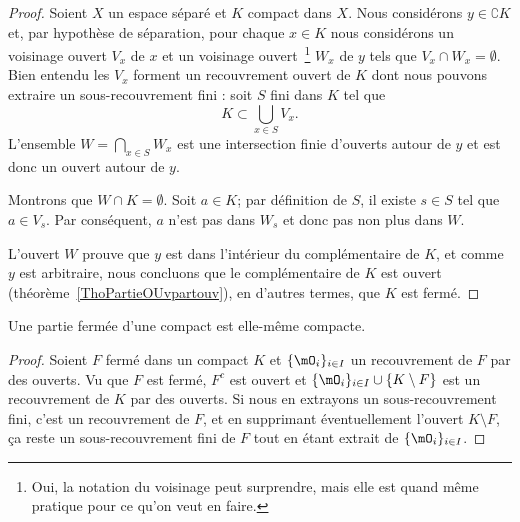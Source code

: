 \begin{proof}
    Soient \( X\) un espace séparé et \( K\) compact dans \( X\). Nous considérons \( y \in\complement K\) et, par hypothèse de séparation, pour chaque \( x\in K\) nous considérons un voisinage ouvert \( V_x\) de \( x\) et un voisinage ouvert~\footnote{Oui, la notation du voisinage peut surprendre, mais elle est quand même pratique pour ce qu'on veut en faire.} \( W_x\) de \( y\) tels que \( V_x\cap W_x=\emptyset\). Bien entendu les \( V_x\) forment un recouvrement ouvert de \( K\) dont nous pouvons extraire un sous-recouvrement fini : soit \( S\) fini dans \( K\) tel que
    \begin{equation}
        K\subset\bigcup_{x\in S}V_x.
    \end{equation}
    L'ensemble \( W=\bigcap_{x\in S}W_x\) est une intersection finie d'ouverts autour de \( y\) et est donc un ouvert autour de \( y\). 
    
    Montrons que \( W\cap K=\emptyset\). Soit \( a\in K\); par définition de \( S\), il existe \( s\in S\) tel que \( a\in V_s\). Par conséquent, \( a\) n'est pas dans \( W_s\) et donc pas non plus dans \( W\).
    

    L'ouvert \( W\) prouve que \( y\) est dans l'intérieur du complémentaire de \( K\), et comme \( y \) est arbitraire, nous concluons que le complémentaire de \( K\) est ouvert (théorème~\ref{ThoPartieOUvpartouv}), en d'autres termes, que \( K\) est fermé.
\end{proof}

\begin{lemma}   \label{LemnAeACf}
    Une partie fermée d'une compact est elle-même compacte.
\end{lemma}

\begin{proof}

    Soient \( F\) fermé dans un compact \( K\) et \( \{ \mO_i \}_{i\in I}\) un recouvrement de \( F\) par des ouverts. Vu que \( F\) est fermé, \( F^c\) est ouvert et \( \{ \mO_i \}_{i\in I}\cup\{ K\setminus F \}\) est un recouvrement de \( K\) par des ouverts. Si nous en extrayons un sous-recouvrement fini, c'est un recouvrement de \( F\), et en supprimant éventuellement l'ouvert \( K\setminus F\), ça reste un sous-recouvrement fini de \( F\) tout en étant extrait de \( \{ \mO_i \}_{i\in I}\).
\end{proof}

